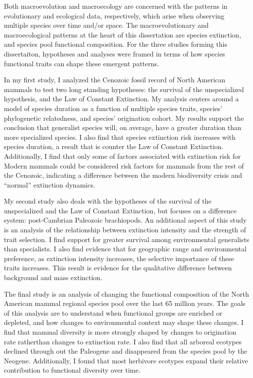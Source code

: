 \documentclass[12pt,letterpaper]{article}
\begin{document}
\linenumbers
\modulolinenumbers[2]

Both macroevolution and macroecology are concerned with the patterns in evolutionary and ecological data, respectively, which arise when observing multiple species over time and/or space. The macroevolutionary and macroecological patterns at the heart of this dissertation are species extinction, and species pool functional composition. For the three studies forming this dissertaiton, hypotheses and analyses were framed in terms of how species functional traits can shape these emergent patterns. 

In my first study, I analyzed the Cenozoic fossil record of North American mammals to test two long standing hypotheses: the survival of the unspecialized hypothesis, and the Law of Constant Extinction. My analysis centers around a model of species duration as a function of multiple species traits, species' phylogenetic relatedness, and species' origination cohort. My results support the conclusion that generalist species will, on average, have a greater duration than more specialized species. I also find that species extinction risk increases with species duration, a result that is counter the Law of Constant Extinction. Additionally, I find that only some of factors associated with extinction risk for Modern mammals could be considered risk factors for mammals from the rest of the Cenozoic, indicating a difference between the modern biodiversity crisis and ``normal'' extinction dynamics.

My second study also deals with the hypotheses of the survival of the unspecialized and the Law of Constant Extinction, but focuses on a difference system: post-Cambrian Paleozoic brachiopods. An additional aspect of this study is an analysis of the relationship between extinction intensity and the strength of trait selection. I find support for greater survival among environmental generalists than specialists. I also find evidence that for geographic range and environmental preference, as extinction intensity increases, the selective importance of these traits increases. This result is evidence for the qualitative difference between background and mass extinction.

The final study is an analysis of changing the functional composition of the North American mammal regional species pool over the last 65 million years. The goals of this analysis are to understand when functional groups are enriched or depleted, and how changes to environmental context may shape these changes. I find that mammal diversity is more strongly shaped by changes to origination rate ratherthan changes to extinction rate. I also find that all arboreal ecotypes declined through out the Paleogene and disappeared from the species pool by the Neogene. Additionally, I found that most herbivore ecotypes expand their relative contribution to functional diversity over time.
\end{document}
